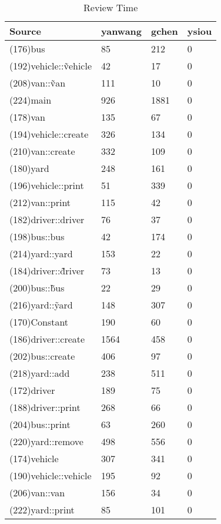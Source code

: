 \begin{table}[hb]
\begin{center}
\begin{tabular}{|l|l|l|l|}
\hline
Source & yanwang & gchen & ysiou\\
\hline
(176)bus & 85 & 212 & 0\\
(192)vehicle::\~vehicle & 42 & 17 & 0\\
(208)van::\~van & 111 & 10 & 0\\
(224)main & 926 & 1881 & 0\\
(178)van & 135 & 67 & 0\\
(194)vehicle::create & 326 & 134 & 0\\
(210)van::create & 332 & 109 & 0\\
(180)yard & 248 & 161 & 0\\
(196)vehicle::print & 51 & 339 & 0\\
(212)van::print & 115 & 42 & 0\\
(182)driver::driver & 76 & 37 & 0\\
(198)bus::bus & 42 & 174 & 0\\
(214)yard::yard & 153 & 22 & 0\\
(184)driver::\~driver & 73 & 13 & 0\\
(200)bus::\~bus & 22 & 29 & 0\\
(216)yard::\~yard & 148 & 307 & 0\\
(170)Constant & 190 & 60 & 0\\
(186)driver::create & 1564 & 458 & 0\\
(202)bus::create & 406 & 97 & 0\\
(218)yard::add & 238 & 511 & 0\\
(172)driver & 189 & 75 & 0\\
(188)driver::print & 268 & 66 & 0\\
(204)bus::print & 63 & 260 & 0\\
(220)yard::remove & 498 & 556 & 0\\
(174)vehicle & 307 & 341 & 0\\
(190)vehicle::vehicle & 195 & 92 & 0\\
(206)van::van & 156 & 34 & 0\\
(222)yard::print & 85 & 101 & 0\\
\hline
\end{tabular}
\end{center}
\caption{Review Time}
\end{table}


